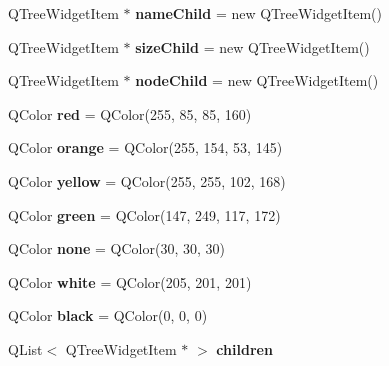 \begin{DoxyCompactItemize}
\item 
Q\+Tree\+Widget\+Item $\ast$ {\bfseries name\+Child} = new Q\+Tree\+Widget\+Item()\hypertarget{class_item_a36bee9c8e4939a2ea09f35959d92085c}{}\label{class_item_a36bee9c8e4939a2ea09f35959d92085c}

\item 
Q\+Tree\+Widget\+Item $\ast$ {\bfseries size\+Child} = new Q\+Tree\+Widget\+Item()\hypertarget{class_item_af9fdb7357f22c8bea0beaad328d039b1}{}\label{class_item_af9fdb7357f22c8bea0beaad328d039b1}

\item 
Q\+Tree\+Widget\+Item $\ast$ {\bfseries node\+Child} = new Q\+Tree\+Widget\+Item()\hypertarget{class_item_ad07e9cb0b74ac17356e8bbc6ba62df11}{}\label{class_item_ad07e9cb0b74ac17356e8bbc6ba62df11}

\item 
Q\+Color {\bfseries red} = Q\+Color(255, 85, 85, 160)\hypertarget{class_item_ae43b892650899d44450294ba6b1b2085}{}\label{class_item_ae43b892650899d44450294ba6b1b2085}

\item 
Q\+Color {\bfseries orange} = Q\+Color(255, 154, 53, 145)\hypertarget{class_item_ae7ef22a84bbb3dbf47fae44cd34e5515}{}\label{class_item_ae7ef22a84bbb3dbf47fae44cd34e5515}

\item 
Q\+Color {\bfseries yellow} = Q\+Color(255, 255, 102, 168)\hypertarget{class_item_aad644ef4f2669e8cecfd235c2ae59469}{}\label{class_item_aad644ef4f2669e8cecfd235c2ae59469}

\item 
Q\+Color {\bfseries green} = Q\+Color(147, 249, 117, 172)\hypertarget{class_item_ab01fb8623755592211b8b1c23d348858}{}\label{class_item_ab01fb8623755592211b8b1c23d348858}

\item 
Q\+Color {\bfseries none} = Q\+Color(30, 30, 30)\hypertarget{class_item_a2d25176d7c295ce4d93576b6a55086e3}{}\label{class_item_a2d25176d7c295ce4d93576b6a55086e3}

\item 
Q\+Color {\bfseries white} = Q\+Color(205, 201, 201)\hypertarget{class_item_a419222ec51284718e4885aec07420ff2}{}\label{class_item_a419222ec51284718e4885aec07420ff2}

\item 
Q\+Color {\bfseries black} = Q\+Color(0, 0, 0)\hypertarget{class_item_a49e03569bb870f97be93907a6027b35f}{}\label{class_item_a49e03569bb870f97be93907a6027b35f}

\item 
Q\+List$<$ Q\+Tree\+Widget\+Item $\ast$ $>$ {\bfseries children}\hypertarget{class_item_ac6edaa8dddd074caf70790add03f0584}{}\label{class_item_ac6edaa8dddd074caf70790add03f0584}

\end{DoxyCompactItemize}



